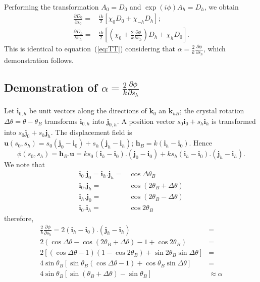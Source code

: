 \documentclass[preprint]{iucr}              %
\begin{document}
Performing the transformation $A_0=D_0$ and $\exp(i\phi) A_h=D_h$, we obtain
\begin{subequations}
\begin{align}
\frac{\partial D_0}{\partial s_0} =& \frac{ik}{2} \left[ \chi_0 D_0+ \chi_{-h} D_h\right]; \\
\frac{\partial D_h}{\partial s_h} =& \frac{ik}{2} \left[ (\chi_0 + \frac{2}{k}\frac{\partial\phi}{\partial s_h} ) D_h+ \chi_{h} D_0\right].
\end{align}
\end{subequations}
This is identical to equation~(\ref{eq:TT}) considering that $\alpha=\frac{2}{k}\frac{\partial\phi}{\partial s_h}$, which demonstration follows.

\subsection{Demonstration of $\alpha=\frac{2}{k}\frac{\partial\phi}{\partial s_h}$ }

Let $\textbf{i}_{0,h}$ be unit vectors along the directions of $\textbf{k}_0$ an $\textbf{k}_{hB}$; the crystal rotation $\Delta\theta=\theta-\theta_B$ transforms $\textbf{i}_{0,h}$ into $\textbf{j}_{0,h}$. A position vector $s_0\textbf{i}_0+s_h\textbf{i}_h$ is transformed into $s_0\textbf{j}_0+s_h\textbf{j}_h$. The displacement field is $\textbf{u}(s_0,s_h)=s_0(\textbf{j}_0-\textbf{i}_0)+ s_h(\textbf{j}_h-\textbf{i}_h)$; $\textbf{h}_B=k(\textbf{i}_h-\textbf{i}_0)$. Hence
\begin{equation}
    \phi(s_0,s_h)=\textbf{h}_B.\textbf{u}=k s_0(\textbf{i}_h-\textbf{i}_0).(\textbf{j}_0-\textbf{i}_0) + 
    k s_h(\textbf{i}_h-\textbf{i}_0).(\textbf{j}_h-\textbf{i}_h).
\end{equation}
We note that 
\begin{subequations}
\begin{align}
    \textbf{i}_0.\textbf{j}_0=\textbf{i}_h.\textbf{j}_h=&\cos\Delta\theta_B \\
    \textbf{i}_0.\textbf{j}_h=&\cos(2\theta_B +\Delta\theta) \\
    \textbf{i}_h.\textbf{j}_0=&\cos(2\theta_B -\Delta\theta) \\
    \textbf{i}_0.\textbf{i}_h=&\cos2\theta_B
\end{align}
\end{subequations}
therefore, 
\begin{subequations}
\begin{align}
    \frac{2}{k}\frac{\partial\phi}{\partial s_h} =  2(\textbf{i}_h-\textbf{i}_0).(\textbf{j}_h-\textbf{i}_h)&= \nonumber\\
    2(\cos\Delta\theta - \cos(2\theta_B+\Delta\theta)-1+\cos2\theta_B)&= \nonumber\\
    2[(\cos\Delta\theta-1)(1-\cos2\theta_B)+\sin2\theta_B\sin\Delta\theta]&=\nonumber\\
    4 \sin\theta_B[\sin\theta_B(\cos\Delta\theta-1)+\cos\theta_B\sin\Delta\theta]&=\nonumber\\
    4 \sin\theta_B[\sin(\theta_B+\Delta\theta)-\sin\theta_B]&\approx
    \alpha
\end{align}
\end{subequations}
\end{document}
